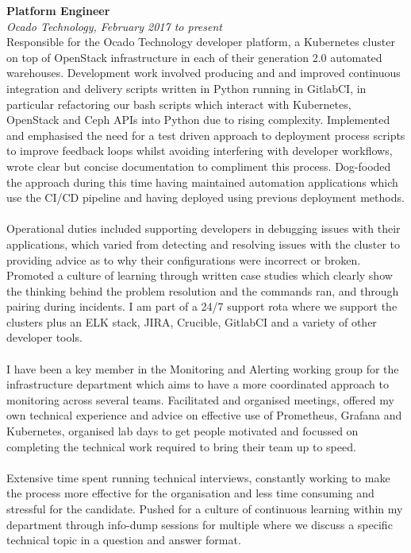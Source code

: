 \documentclass{article}
\begin{document}
\begin{flushleft}
\textbf{Platform Engineer}\\
\textit{Ocado Technology, February 2017 to present}\\[5pt]
Responsible for the Ocado Technology developer platform, a Kubernetes cluster on top of OpenStack infrastructure in each of their generation 2.0 automated warehouses. Development work involved producing and and improved continuous integration and delivery scripts written in Python running in GitlabCI, in particular refactoring our bash scripts which interact with Kubernetes, OpenStack and Ceph APIs into Python due to rising complexity. Implemented and emphasised the need for a test driven approach to deployment process scripts to improve feedback loops whilst avoiding interfering with developer workflows, wrote clear but concise documentation to compliment this process. Dog-fooded the approach during this time having maintained automation applications which use the CI/CD pipeline and having deployed using previous deployment methods.


\paragraph{}Operational duties included supporting developers in debugging issues with their applications, which varied from detecting and resolving issues with the cluster to providing advice as to why their configurations were incorrect or broken. Promoted a culture of learning through written case studies which clearly show the thinking behind the problem resolution and the commands ran, and through pairing during incidents. I am part of a 24/7 support rota where we support the clusters plus an ELK stack, JIRA, Crucible, GitlabCI and a variety of other developer tools. 


\paragraph{}I have been a key member in the Monitoring and Alerting working group for the infrastructure department which aims to have a more coordinated approach to monitoring across several teams. Facilitated and organised meetings, offered my own technical experience and advice on effective use of Prometheus, Grafana and Kubernetes, organised lab days to get people motivated and focussed on completing the technical work required to bring their team up to speed. 

\paragraph{}Extensive time spent running technical interviews, constantly working to make the process more effective for the organisation and less time consuming and stressful for the candidate. Pushed for a culture of continuous learning within my department through info-dump sessions for multiple where we discuss a specific technical topic in a question and answer format.


\end{flushleft}
\end{document}
